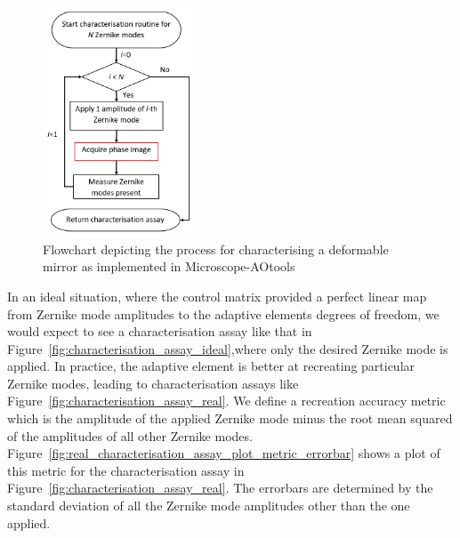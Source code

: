 \begin{figure}[h]
	\centering
	\includegraphics[width=0.4\textwidth, scale=0.5]{./images/characterisation_workflow.jpg}
	\caption{Flowchart depicting the process for characterising a deformable mirror as implemented in Microscope-AOtools}
	\label{fig:characterisation_workflow}
\end{figure}

In an ideal situation, where the control matrix provided a perfect linear map from Zernike mode amplitudes to the adaptive elements degrees of freedom, we would expect to see a characterisation assay like that in Figure~\ref{fig:characterisation_assay_ideal},where only the desired Zernike mode is applied. In practice, the adaptive element is better at recreating particular Zernike modes, 
leading  to characterisation assays like Figure~\ref{fig:characterisation_assay_real}. We define a
recreation accuracy metric which is the amplitude of the applied Zernike mode minus the root mean squared of the amplitudes of all other Zernike modes. Figure~\ref{fig:real_characterisation_assay_plot_metric_errorbar} shows a plot of this metric for the characterisation assay in Figure~\ref{fig:characterisation_assay_real}. The errorbars are determined by the standard deviation of all the Zernike mode amplitudes other than the one applied.

